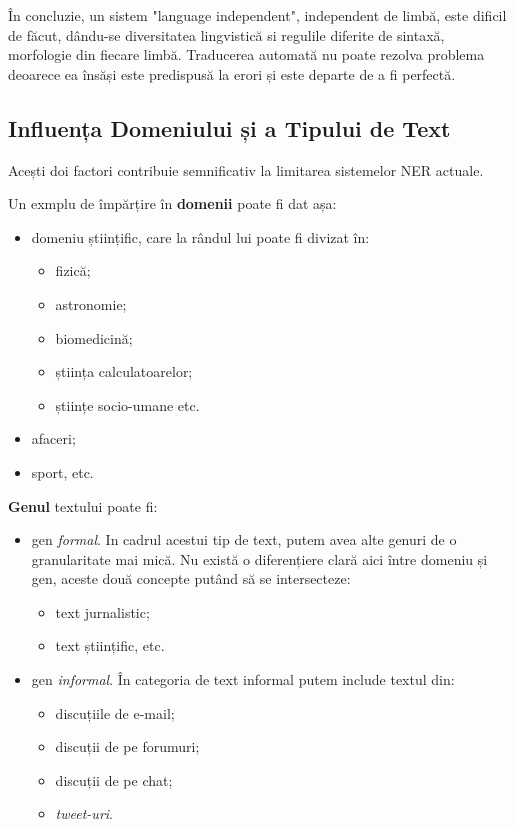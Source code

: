 În concluzie, un sistem "language independent", independent de limbă, este dificil de făcut, dându-se diversitatea lingvistică si regulile diferite de sintaxă, morfologie din fiecare limbă. Traducerea automată nu poate rezolva problema deoarece ea însăși este predispusă la erori și este departe de a fi perfectă.


\subsection{Influența Domeniului și a Tipului de Text}
\label{sub-sec:domain-influence}

Acești doi factori contribuie semnificativ la limitarea sistemelor NER actuale. 

Un exmplu de împărțire în \textbf{domenii} poate fi dat așa:
\begin{itemize}
	\item domeniu științific, care la rândul lui poate fi divizat în:
	\begin{itemize}
		\item fizică;
		\item astronomie;
		\item biomedicină;
		\item știința calculatoarelor;
		\item științe socio-umane etc.
		
	\end{itemize}
	\item afaceri;
	\item sport, etc.	
\end{itemize}

\textbf{Genul} textului poate fi:

\begin{itemize}
	\item gen \textit{formal}. In cadrul acestui tip de text, putem avea alte genuri de o granularitate mai mică.  Nu există o diferențiere clară aici între domeniu și gen, aceste două concepte putând să se intersecteze:
	\begin{itemize}
		\item text jurnalistic;
		\item text științific, etc.
	\end{itemize}
	\item gen \textit{informal}. În categoria de text informal putem include textul din:
	\begin{itemize}
		\item discuțiile de e-mail;
		\item discuții de pe forumuri;
		\item discuții de pe chat;
		\item \textit{tweet-uri}.
	\end{itemize}
\end{itemize}

